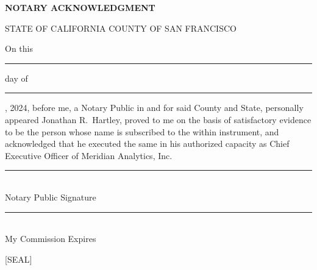 \vspace{3em}
\noindent
\begin{minipage}[t]{0.48\textwidth}
  \begin{tcolorbox}[
    colback=white,
    colframe=accent!25,
    sharp corners,
    boxrule=0.4pt,
    left=10pt,
    right=10pt,
    top=10pt,
    bottom=10pt,
  ]
    {\footnotesize\bfseries\color{accent}NOTARY ACKNOWLEDGMENT}

    \smallskip
    {\footnotesize STATE OF CALIFORNIA \hfill COUNTY OF SAN FRANCISCO}

    \smallskip
    {\scriptsize On this \rule{1cm}{0.2pt} day of \rule{1.5cm}{0.2pt}, 2024, before me, a Notary Public in and for said County and State, personally appeared Jonathan R.\ Hartley, proved to me on the basis of satisfactory evidence to be the person whose name is subscribed to the within instrument, and acknowledged that he executed the same in his authorized capacity as Chief Executive Officer of Meridian Analytics, Inc.}

    \vspace{1.5em}
    \noindent\rule{0.7\linewidth}{0.3pt}\\[4pt]
    {\footnotesize\color{medium}Notary Public Signature}\\[1em]

    \noindent\rule{0.7\linewidth}{0.3pt}\\[4pt]
    {\footnotesize\color{medium}My Commission Expires}

    \vspace{0.5em}
    {\tiny [SEAL]}
  \end{tcolorbox}
\end{minipage}
\hfill
